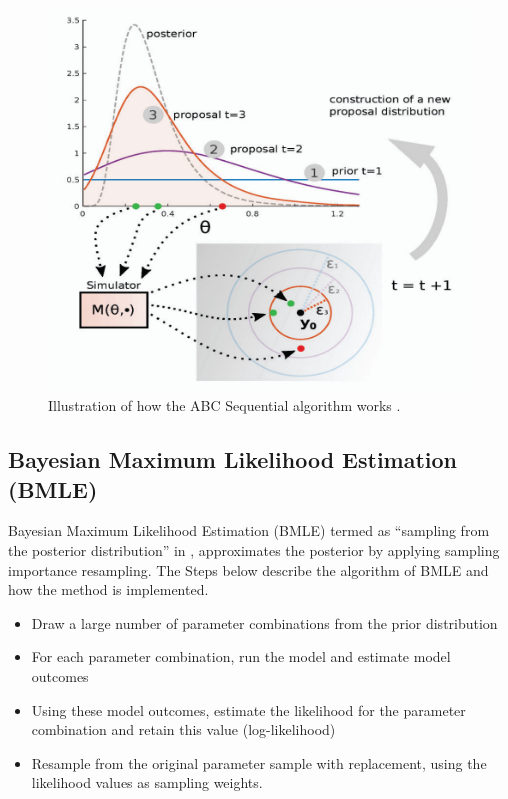 \begin{figure}[h!]
	\includegraphics[width=\linewidth]{seq.png}
	\caption{Illustration of how the ABC Sequential algorithm works \cite{lint}.}
	\label{seq}
\end{figure}


\subsection{Bayesian Maximum Likelihood Estimation (BMLE)}

Bayesian Maximum Likelihood Estimation (BMLE) termed as “sampling from the posterior distribution” in \cite{Menzies}, approximates the posterior by applying sampling importance resampling. 
The Steps below describe the algorithm of BMLE and how the method is implemented.
\begin{itemize}
	\item 	Draw a large number of parameter combinations from the prior distribution
	\item For each parameter combination, run the model and estimate model outcomes
	\item Using these model outcomes, estimate the likelihood for the parameter combination and retain this value (log-likelihood)
	\item Resample from the original parameter sample with replacement, using the likelihood values as sampling weights.
\end{itemize}

